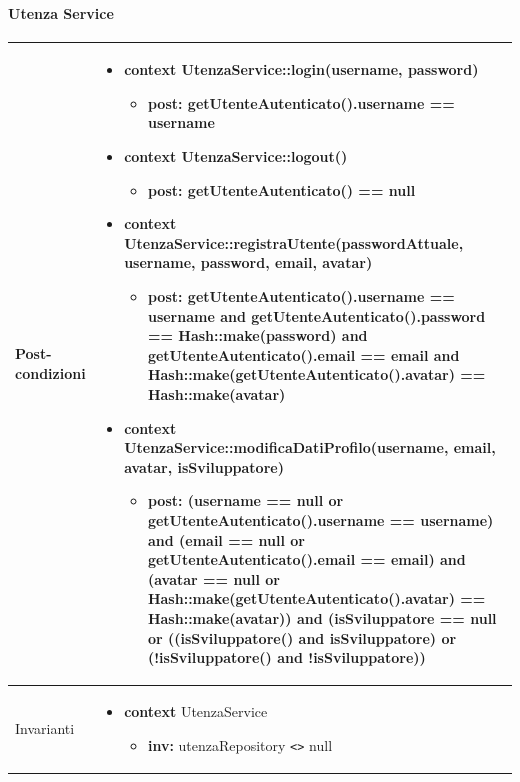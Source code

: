 \paragraph{Utenza Service}
\small\begin{tabular}{|| l | p{28em} ||} 
\hline
Post-condizioni & \begin{itemize}[leftmargin=*]
	\item \textbf{context} UtenzaService::login(username, password)
	\begin{itemize}
		\item[ ] \textbf{post:} getUtenteAutenticato().username == username
	\end{itemize}

	\item \textbf{context} UtenzaService::logout()
	\begin{itemize}
		\item[ ] \textbf{post:} getUtenteAutenticato() == null
	\end{itemize}
	
	\item \textbf{context} UtenzaService::registraUtente(passwordAttuale, username, password, email, avatar)
	\begin{itemize}
		\item[ ] \textbf{post:} getUtenteAutenticato().username == username and getUtenteAutenticato().password == Hash::make(password) and getUtenteAutenticato().email == email and Hash::make(getUtenteAutenticato().avatar) == Hash::make(avatar)
	\end{itemize}
	
	\item \textbf{context} UtenzaService::modificaDatiProfilo(username, email, avatar, isSviluppatore)
	\begin{itemize}
		\item[ ] \textbf{post:} (username == null or getUtenteAutenticato().username == username) and (email == null or getUtenteAutenticato().email == email) and (avatar == null or Hash::make(getUtenteAutenticato().avatar) == Hash::make(avatar)) and (isSviluppatore == null or ((isSviluppatore() and isSviluppatore) or (!isSviluppatore() and !isSviluppatore))
	\end{itemize}
\end{itemize}\\
\hline
Invarianti & \begin{itemize}
	\item \textbf{context} UtenzaService
	\begin{itemize}
		\item[ ] \textbf{inv:} utenzaRepository \verb|<>| null
	\end{itemize}
\end{itemize}\\
\hline
\end{tabular}

